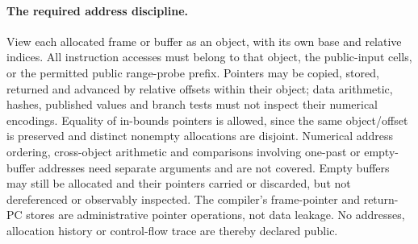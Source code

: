 \paragraph{The required address discipline.} View each allocated frame or buffer as an object, with its own base and relative indices. All instruction accesses must belong to that object, the public-input cells, or the permitted public range-probe prefix. Pointers may be copied, stored, returned and advanced by relative offsets within their object; data arithmetic, hashes, published values and branch tests must not inspect their numerical encodings. Equality of in-bounds pointers is allowed, since the same object/offset is preserved and distinct nonempty allocations are disjoint. Numerical address ordering, cross-object arithmetic and comparisons involving one-past or empty-buffer addresses need separate arguments and are not covered. Empty buffers may still be allocated and their pointers carried or discarded, but not dereferenced or observably inspected. The compiler's frame-pointer and return-PC stores are administrative pointer operations, not data leakage. No addresses, allocation history or control-flow trace are thereby declared public.

